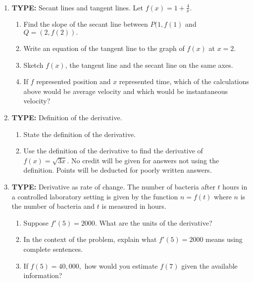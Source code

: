 \documentclass[11pt,fleqn]{article}
\begin{document}
\renewcommand{\headrulewidth}{0pt}
\newcommand{\blank}[1]{\rule{#1}{0.75pt}}
\newcommand{\bc}{\begin{center}}
\newcommand{\ec}{\end{center}}
\renewcommand{\d}{\displaystyle}

\vspace*{-0.7in}

\begin{center}
  \large
  \\ \vfill
\end{center}
\vspace*{-.25in}
\begin{enumerate}
\item \textbf{TYPE:} Secant lines and tangent lines.
Let $f(x)=1+ \frac{4}{x}.$
\begin{enumerate}
	\item Find the slope of the secant line between $P(1,f(1)$ and $Q=(2,f(2)).$
	\item Write an equation of the tangent line to the graph of $f(x)$ at $x=2.$
	\item Sketch $f(x)$, the tangent line and the secant line on the same axes.
	\item If $f$ represented position and $x$ represented time, which of the calculations above would be average velocity and which would be instantaneous velocity?
\end{enumerate}

\item  \textbf{TYPE:} Definition of the derivative.
\begin{enumerate}
	\item State the definition of the derivative.
	\item Use the definition of the derivative to find the derivative of $f(x)=\sqrt{3x}.$ No credit will be given for answers not using the definition. Points will be deducted for poorly written answers.
\end{enumerate}

\item \textbf{TYPE:} Derivative as rate of change. 
The  number of bacteria after $t$ hours in a controlled laboratory setting is given by the function $n=f(t)$ where $n$ is the number of bacteria and $t$ is measured in hours.
\begin{enumerate}
	\item Suppose $f'(5)=2000.$ What are the units of the derivative?
	\item In the context of the problem, explain what $f'(5)=2000$ means using complete sentences. 
	\item If $f(5)=40,000,$ how would you estimate $f(7)$ given the available information?
\end{enumerate} 


\end{enumerate}
\end{document}

